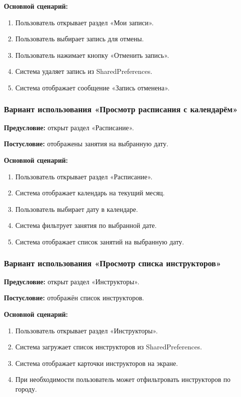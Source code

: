 \textbf{Основной сценарий:}
\begin{enumerate}
	\item Пользователь открывает раздел «Мои записи».
	\item Пользователь выбирает запись для отмены.
	\item Пользователь нажимает кнопку «Отменить запись».
	\item Система удаляет запись из SharedPreferences.
	\item Система отображает сообщение «Запись отменена».
\end{enumerate}

\subsubsection{Вариант использования «Просмотр расписания с календарём»}

\textbf{Предусловие:} открыт раздел «Расписание».

\textbf{Постусловие:} отображены занятия на выбранную дату.

\textbf{Основной сценарий:}
\begin{enumerate}
	\item Пользователь открывает раздел «Расписание».
	\item Система отображает календарь на текущий месяц.
	\item Пользователь выбирает дату в календаре.
	\item Система фильтрует занятия по выбранной дате.
	\item Система отображает список занятий на выбранную дату.
\end{enumerate}

\subsubsection{Вариант использования «Просмотр списка инструкторов»}

\textbf{Предусловие:} открыт раздел «Инструкторы».

\textbf{Постусловие:} отображён список инструкторов.

\textbf{Основной сценарий:}
\begin{enumerate}
	\item Пользователь открывает раздел «Инструкторы».
	\item Система загружает список инструкторов из SharedPreferences.
	\item Система отображает карточки инструкторов на экране.
	\item При необходимости пользователь может отфильтровать инструкторов по городу.
\end{enumerate}

